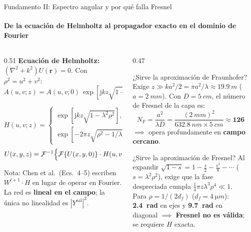 \documentclass[aspectratio=169,10pt]{beamer}
\newcommand{\jj}{\mathrm{j}}
\newcommand{\FT}{\mathcal{F}}
\newcommand{\IFT}{\mathcal{F}^{-1}}
\begin{document}
\begin{frame}{Fundamento II: Espectro angular y por qué falla Fresnel}
\framesubtitle{De la ecuación de Helmholtz al propagador exacto en el dominio de Fourier}
\begin{columns}[T,onlytextwidth]
  \begin{column}{0.51\textwidth}
    \footnotesize
    \textbf{Ecuación de Helmholtz:} $(\nabla^2+k^2)U(\bm r)=0$.
    Con $\rho^2=u^2+v^2$:
    \[
      A(u,v;z)=A(u,v;0)\,\exp\!\left[\jj kz\sqrt{1-\lambda^2\rho^2}\right]
    \]
    \begin{destacado}
      \scriptsize\vspace{-3pt}
      \[
        H(u,v;z)=
        \begin{cases}
          \exp\!\left[\jj kz\sqrt{1-\lambda^2\rho^2}\right], & \rho^2\le 1/\lambda^2\\
          \exp\!\left[-2\pi z\sqrt{\rho^2-1/\lambda^2}\right], & \rho^2> 1/\lambda^2
        \end{cases}
      \]
      \vspace{-4pt}
      \[
        U(x,y,z)=\IFT\Bigl\{\FT\{U(x,y,0)\}\cdot H(u,v;z)\Bigr\}
      \]
    \end{destacado}
    \vspace{1pt}
    {\scriptsize\color{gris} Nota: Chen et al.\ (Ecs.\ 4--5) escriben $W^{l+1}\cdot H$ en lugar de operar en Fourier. La red es \textbf{lineal en el campo}; la única no linealidad es $|Y^{\text{sal}}|^2$.}
  \end{column}
  \begin{column}{0.47\textwidth}
    \begin{caja}{¿Sirve la aproximación de Fraunhofer?}
      \scriptsize
      Exige $z\gg ka^2/2=\pi a^2/\lambda\approx\SI{19.9}{m}$ ($a=\SI{2}{mm}$). Con $D=\SI{5}{cm}$, el número de Fresnel de la capa es:
      \[
        N_F=\frac{a^2}{\lambda D}=\frac{(\SI{2}{mm})^2}{\SI{632.8}{nm}\times\SI{5}{cm}}\approx\mathbf{126}
      \]
      $\implies$ opera profundamente en \textbf{campo cercano}.
    \end{caja}
    \vspace{3pt}
    \begin{azulbox}{¿Sirve la aproximación de Fresnel?}
      \scriptsize
      Al expandir $\sqrt{1-s}=1-\frac{s}{2}-\frac{s^2}{8}-\cdots$ ($s=\lambda^2\rho^2$), exige que la fase despreciada cumpla
      $\frac{1}{4}\pi z\lambda^3\rho^4\ll 1$.\\[2pt]
      Para $\rho=1/(2d_f)$ ($d_f=\SI{4}{\micro m}$): \textbf{\SI{2.4}{rad}} en ejes y \textbf{\SI{9.7}{rad}} en diagonal $\implies$ \textbf{Fresnel no es válida}; se requiere $H$ exacta.
    \end{azulbox}
  \end{column}
\end{columns}
\end{frame}
\end{document}
